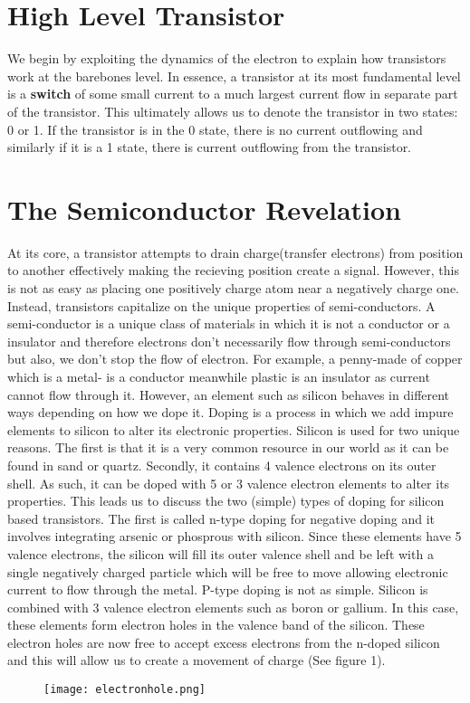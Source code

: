 \documentclass{article}
\begin{document}
\section{High Level Transistor}
We begin by exploiting the dynamics of the electron to explain how transistors work at the barebones level.
In essence, a transistor at its most fundamental level is a \textbf{switch} of some small current to a much largest current flow in separate part of the transistor. This ultimately allows us to denote the transistor in two states: 0 or 1. If the transistor is in the 0 state, there is no current outflowing and similarly if it is a 1 state, there is current outflowing from the transistor. 
\section{The Semiconductor Revelation}
At its core, a transistor attempts to drain charge(transfer electrons) from position to another effectively making the recieving position create a signal. However, this is not as easy as placing one positively charge atom near a negatively charge one. Instead, transistors capitalize on the unique properties of semi-conductors. A semi-conductor is a unique class of materials in which it is not a conductor or a insulator and therefore electrons don't necessarily flow through semi-conductors but also, we don't stop the flow of electron. For example, a penny-made of copper which is a metal- is a conductor meanwhile plastic is an insulator as current cannot flow through it. However, an element such as silicon behaves in different ways depending on how we dope it. Doping is a process in which we add impure elements to silicon to alter its electronic properties. Silicon is used for two unique reasons. The first is that it is a very common resource in our world as it can be found in sand or quartz. Secondly, it contains 4 valence electrons on its outer shell. As such, it can be doped with 5 or 3 valence electron elements to alter its properties. This leads us to discuss the two (simple) types of doping for silicon based transistors. The first is called n-type doping for negative doping and it involves integrating arsenic or phosprous with silicon. Since these elements have 5 valence electrons, the silicon will fill its outer valence shell and be left with a single negatively charged particle which will be free to move allowing electronic current to flow through the metal. P-type doping is not as simple. Silicon is combined with 3 valence electron elements such as boron or gallium. In this case, these elements form electron holes in the valence band of the silicon. These electron holes are now free to accept excess electrons from the n-doped silicon and this will allow us to create a movement of charge (See figure 1). 
\begin{figure}
\texttt{[image: electronhole.png]}
\end{figure}
\end{document}
